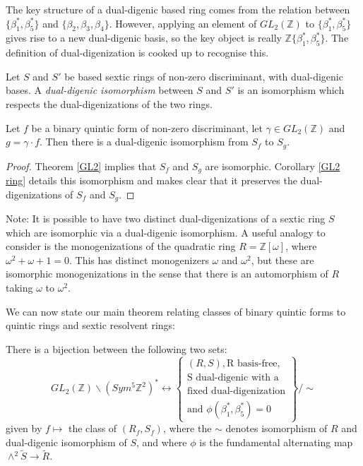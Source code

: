 \documentclass{report}
\begin{document}
The key structure of a dual-digenic based ring comes from the relation between $\{ \beta_1^*, \beta_5^* \}$ and $\{ \beta_2, \beta_3, \beta_4 \}$.  However, applying an element of $GL_2(\mathbb{Z})$ to $\{ \beta_1^*, \beta_5^* \}$ gives rise to a new dual-digenic basis, so the key object is really $\mathbb{Z} \{ \beta_1^*, \beta_5^* \}$.  The definition of dual-digenization is cooked up to recognise this.

\begin{definition}
Let $S$ and $S'$ be based sextic rings of non-zero discriminant, with dual-digenic bases.  A \emph{dual-digenic isomorphism} between $S$ and $S'$ is an isomorphism which respects the dual-digenizations of the two rings.
\end{definition}

\begin{corollary} \label{GL2 dual digenic}
Let $f$ be a binary quintic form of non-zero discriminant, let $\gamma \in GL_2(\mathbb{Z})$ and $g = \gamma \cdot f$.  Then 
there is a dual-digenic isomorphism from $S_f$ to $S_g$.
\end{corollary}
\begin{proof}
Theorem \ref{GL2} implies that $S_f$ and $S_g$ are isomorphic.  Corollary \ref{GL2 ring} details this isomorphism and makes clear that it preserves the dual-digenizations of $S_f$ and $S_g$.
\end{proof}

Note: It is possible to have two distinct dual-digenizations of a sextic ring $S$ which are isomorphic via a dual-digenic isomorphism.  A useful analogy to consider is the monogenizations of the quadratic ring $R = \mathbb{Z}[\omega]$, where $\omega^2 + \omega + 1 = 0$.  This has distinct monogenizers $\omega$ and $\omega^2$, but these are isomorphic monogenizations in the sense that there is an automorphism of $R$ taking $\omega$ to $\omega^2$.

We can now state our main theorem relating classes of binary quintic forms to quintic rings and sextic resolvent rings:
\begin{theorem} \label{main class theorem}
There is a bijection between the following two sets:
\begin{equation}
GL_2(\mathbb{Z}) \backslash (Sym^5 \mathbb{Z}^2)^* \leftrightarrow
\left \{
\begin{array}{l}
(R,S), \text{R basis-free,} \\
\text{S dual-digenic with a} \\
\text{fixed dual-digenization} \\
\text{and } \phi (\beta_1^*,\beta_5^*) = 0 
\end{array}
\right \}
 / \sim
\end{equation}
given by $f \mapsto$ the class of $(R_f, S_f)$, where the $\sim$ denotes isomorphism of $R$ and dual-digenic isomorphism of $S$, and where $\phi$ is the fundamental alternating map $\wedge^2 \tilde{S} \to \tilde{R}$.
\end{theorem}
\end{document}
